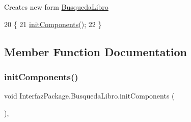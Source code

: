 Creates new form \mbox{\hyperlink{class_interfaz_package_1_1_busqueda_libro}{Busqueda\+Libro}} 
\begin{DoxyCode}
20                            \{
21         \mbox{\hyperlink{class_interfaz_package_1_1_busqueda_libro_a31f59f61bc58603e7a1e76ee35b116fc}{initComponents}}();
22     \}
\end{DoxyCode}


\subsection{Member Function Documentation}
\mbox{\label{class_interfaz_package_1_1_busqueda_libro_a31f59f61bc58603e7a1e76ee35b116fc}} 
\subsubsection{\texorpdfstring{init\+Components()}{initComponents()}}
{\footnotesize\ttfamily void Interfaz\+Package.\+Busqueda\+Libro.\+init\+Components (\begin{DoxyParamCaption}{ }\end{DoxyParamCaption})\hspace{0.3cm}{\ttfamily [inline]}, {\ttfamily [private]}}

